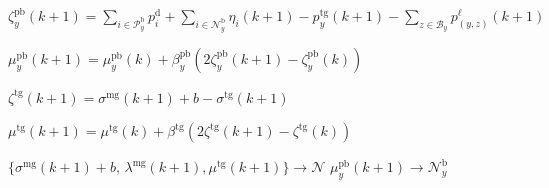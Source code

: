 \documentclass{IEEEtran}  %
\newcommand{\mc}{\mathcal}
\newcommand{\0}{\mathbf{0}}
\newcommand{\1}{\mathbf{1}}
\begin{document}
\begin{algorithm*}[htbp]
\begin{algorithmic}[1]
\State
$\zeta^{\text{pb}}_y(k+1)   = \sum_{i \in \mc P_y^{\mathrm{b}}} p_i^{\mathrm{d}} + \sum_{i \in \mc N_y^{\mathrm{b}}} \eta_i(k+1)- p^{\text{tg}}_y(k+1) - \sum_{z \in \mc B_y} p^\ell_{(y,z)} (k+1)$

\State
$\mu_y^{\text{pb}}(k+1) = \mu_y^{\text{pb}}(k) + \beta^{\text{pb}}_y (2 \zeta^{\text{pb}}_y(k+1)- \zeta^{\text{pb}}_y(k))$
\EndFor

\State
$\zeta^{\text{tg}}(k+1) = \sigma^{\text{mg}}
	(k+1)+b- \sigma^{\text{tg}}(k+1)$

\State
$\mu^{\text{tg}}(k+1) = \mu^{\text{tg}}(k) + \beta^{\text{tg}} (2\zeta^{\text{tg}}(k+1)-\zeta^{\text{tg}}(k))$
\EndDual	

\State
$ \{ \sigma^{\mathrm{mg}}(k+1)+b, \, \lambda^{\text{mg}}(k+1), \mu^{\text{tg}}(k+1) \} 
	\longrightarrow  \mc N$
\ForAll{buses $ y \in \mc B$}
\State
$\mu^{\text{pb}}_y(k+1)\longrightarrow \mc N_y^{\mathrm{b}}$
\EndFor

\EndComm

\EndDNO	

\EndIUC	

\end{algorithmic}
\end{algorithm*}
\end{document}
